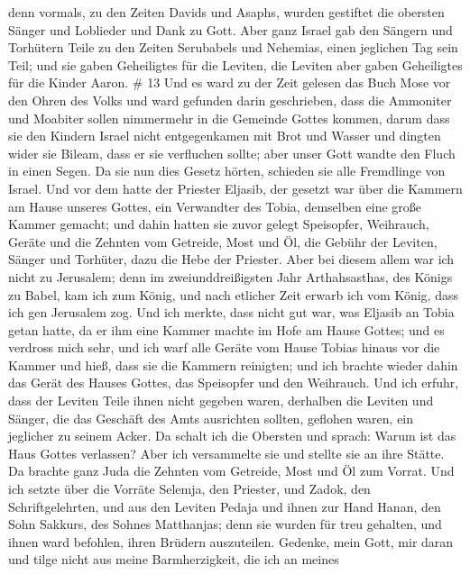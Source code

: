  denn vormals, zu den Zeiten Davids und Asaphs, wurden
gestiftet die obersten Sänger und Loblieder und Dank zu Gott.
 Aber ganz Israel gab den Sängern und Torhütern Teile zu
den Zeiten Serubabels und Nehemias, einen jeglichen Tag sein Teil; und
sie gaben Geheiligtes für die Leviten, die Leviten aber gaben
Geheiligtes für die Kinder Aaron. \# 13  Und es ward zu der
Zeit gelesen das Buch Mose vor den Ohren des Volks und ward gefunden
darin geschrieben, dass die Ammoniter und Moabiter sollen nimmermehr in
die Gemeinde Gottes kommen,  darum dass sie den Kindern
Israel nicht entgegenkamen mit Brot und Wasser und dingten wider sie
Bileam, dass er sie verfluchen sollte; aber unser Gott wandte den Fluch
in einen Segen.  Da sie nun dies Gesetz hörten, schieden sie
alle Fremdlinge von Israel.  Und vor dem hatte der Priester
Eljasib, der gesetzt war über die Kammern am Hause unseres Gottes, ein
Verwandter des Tobia, demselben eine große Kammer gemacht; 
und dahin hatten sie zuvor gelegt Speisopfer, Weihrauch, Geräte und die
Zehnten vom Getreide, Most und Öl, die Gebühr der Leviten, Sänger und
Torhüter, dazu die Hebe der Priester.  Aber bei diesem allem
war ich nicht zu Jerusalem; denn im zweiunddreißigsten Jahr
Arthahsasthas, des Königs zu Babel, kam ich zum König, und nach etlicher
Zeit erwarb ich vom König,  dass ich gen Jerusalem zog. Und
ich merkte, dass nicht gut war, was Eljasib an Tobia getan hatte, da er
ihm eine Kammer machte im Hofe am Hause Gottes;  und es
verdross mich sehr, und ich warf alle Geräte vom Hause Tobias hinaus vor
die Kammer  und hieß, dass sie die Kammern reinigten; und
ich brachte wieder dahin das Gerät des Hauses Gottes, das Speisopfer und
den Weihrauch.  Und ich erfuhr, dass der Leviten Teile
ihnen nicht gegeben waren, derhalben die Leviten und Sänger, die das
Geschäft des Amts ausrichten sollten, geflohen waren, ein jeglicher zu
seinem Acker.  Da schalt ich die Obersten und sprach: Warum
ist das Haus Gottes verlassen? Aber ich versammelte sie und stellte sie
an ihre Stätte.  Da brachte ganz Juda die Zehnten vom
Getreide, Most und Öl zum Vorrat.  Und ich setzte über die
Vorräte Selemja, den Priester, und Zadok, den Schriftgelehrten, und aus
den Leviten Pedaja und ihnen zur Hand Hanan, den Sohn Sakkurs, des
Sohnes Matthanjas; denn sie wurden für treu gehalten, und ihnen ward
befohlen, ihren Brüdern auszuteilen.  Gedenke, mein Gott,
mir daran und tilge nicht aus meine Barmherzigkeit, die ich an meines
